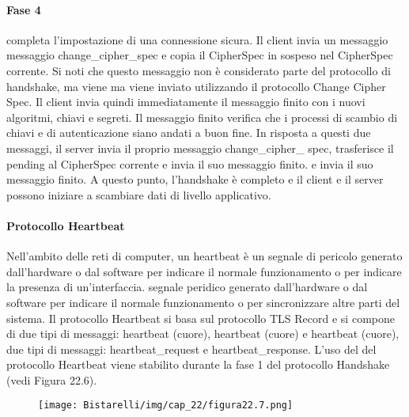 \singlespacing

\paragraph{Fase 4} completa l'impostazione di una connessione sicura. Il client invia un messaggio messaggio change\_cipher\_spec e copia il CipherSpec in sospeso nel CipherSpec corrente. Si noti che questo messaggio non è considerato parte del protocollo di handshake, ma viene ma viene inviato utilizzando il protocollo Change Cipher Spec. Il client invia quindi immediatamente il messaggio finito con i nuovi algoritmi, chiavi e segreti. Il messaggio finito verifica che i processi di scambio di chiavi e di autenticazione siano andati a buon fine. In risposta a questi due messaggi, il server invia il proprio messaggio change\_cipher\_ spec, trasferisce il pending al CipherSpec corrente e invia il suo messaggio finito. e invia il suo messaggio finito. A questo punto, l'handshake è completo e il client e il server possono iniziare a scambiare dati di livello applicativo. 

\singlespacing

\paragraph{Protocollo Heartbeat} Nell'ambito delle reti di computer, un heartbeat è un segnale di pericolo generato dall'hardware o dal software per indicare il normale funzionamento o per indicare la presenza di un'interfaccia.
segnale peridico generato dall'hardware o dal software per indicare il normale funzionamento o per sincronizzare altre parti del sistema. Il protocollo Heartbeat si basa sul protocollo TLS Record e si compone di due tipi di messaggi: heartbeat (cuore), heartbeat (cuore) e heartbeat (cuore), due tipi di messaggi: heartbeat\_request e heartbeat\_response. L'uso del del protocollo Heartbeat viene stabilito durante la fase 1 del protocollo Handshake (vedi Figura 22.6). 

\begin{figure}[H]
	\centering
    \texttt{[image: Bistarelli/img/cap\_22/figura22.7.png]}
\end{figure}

